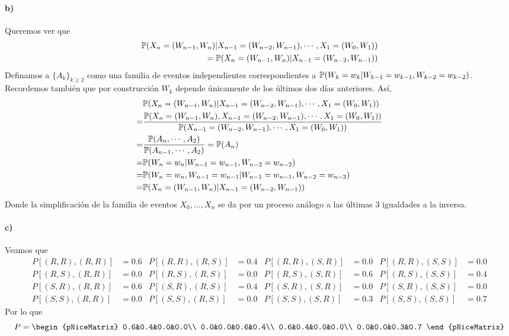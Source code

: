 \documentclass[a4paper,12pt]{article}
\begin{document}
\paragraph{b)} Queremos ver que
\begin{align*}
\mathbb{P}(X_n=(W_{n-1},W_{n})|X_{n-1}=(W_{n-2},W_{n-1}),\cdots,X_1=(W_{0},W_{1}))\\
=\mathbb{P}(X_n=(W_{n-1},W_{n})|X_{n-1}=(W_{n-2},W_{n-1}))
\end{align*}
Definamos a $\{A_k\}_{k\geqslant 2}$ como una familia de eventos independientes correspondientes a $\mathbb{P}(W_k=w_k|W_{k-1}=w_{k-1},W_{k-2}=w_{k-2})$. Recordemos también que por construcción $W_k$ depende únicamente de los últimos dos días anteriores. Así,
\begin{align*}
    &\mathbb{P}(X_n=(W_{n-1},W_{n})|X_{n-1}=(W_{n-2},W_{n-1}),\cdots,X_1=(W_{0},W_{1}))\\
    =&\frac{\mathbb{P}(X_n=(W_{n-1},W_{n}),X_{n-1}=(W_{n-2},W_{n-1}),\cdots,X_1=(W_{0},W_{1}))}{\mathbb{P}(X_{n-1}=(W_{n-2},W_{n-1}),\cdots,X_1=(W_{0},W_{1}))}\\
    =&\frac{\mathbb{P}(A_n,\cdots,A_2)}{\mathbb{P}(A_{n-1},\cdots,A_2)}=\mathbb{P}(A_n)\\
    =&\mathbb{P}(W_n=w_n|W_{n-1}=w_{n-1},W_{n-2}=w_{n-2})\\
    =&\mathbb{P}(W_n=w_n,W_{n-1}=w_{n-1}|W_{n-1}=w_{n-1},W_{n-2}=w_{n-2})\\
    =&\mathbb{P}(X_n=(W_{n-1},W_{n})|X_{n-1}=(W_{n-2},W_{n-1}))
\end{align*}
Donde la simplificación de la familia de eventos $X_0,...,X_n$ se da por un proceso análogo a las últimas 3 igualdades a la inversa.
\paragraph{c)} Veamos que 
{\small\begin{align*}
    P[(R,R),(R,R)] &= 0.6 & P[(R,R),(R,S)] &=0.4 & 
    P[(R,R),(S,R)] &= 0.0 & P[(R,R),(S,S)] &=0.0\\
    P[(R,S),(R,R)] &= 0.0 & P[(R,S),(R,S)] &=0.0 & 
    P[(R,S),(S,R)] &= 0.6 & P[(R,S),(S,S)] &=0.4\\
    P[(S,R),(R,R)] &= 0.6 & P[(S,R),(R,S)] &=0.4 & 
    P[(S,R),(S,R)] &= 0.0 & P[(S,R),(S,S)] &=0.0\\
    P[(S,S),(R,R)] &= 0.0 & P[(S,S),(R,S)] &=0.0 & 
    P[(S,S),(S,R)] &= 0.3 & P[(S,S),(S,S)] &=0.7
\end{align*}}
Por lo que
\[
P = \begin{pNiceMatrix}
    0.6&0.4&0.0&0.0\\
    0.0&0.0&0.6&0.4\\
    0.6&0.4&0.0&0.0\\
    0.0&0.0&0.3&0.7
\end{pNiceMatrix}
\]
\end{document}
